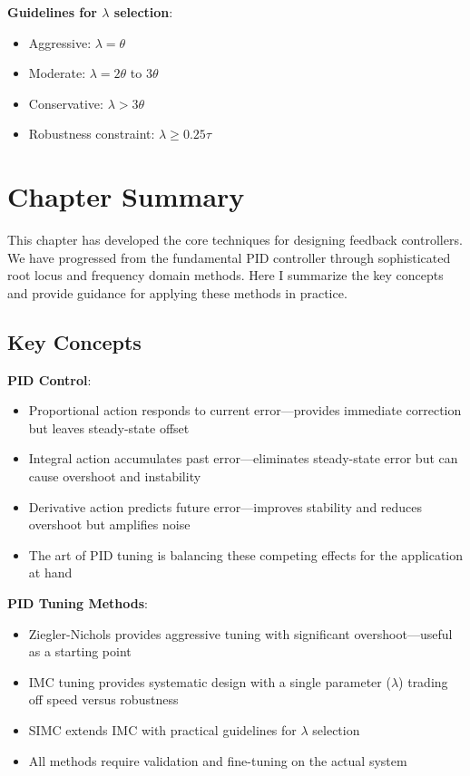 \textbf{Guidelines for $\lambda$ selection}:
\begin{itemize}
    \item Aggressive: $\lambda = \theta$
    \item Moderate: $\lambda = 2\theta$ to $3\theta$
    \item Conservative: $\lambda > 3\theta$
    \item Robustness constraint: $\lambda \geq 0.25\tau$
\end{itemize}

\section{Chapter Summary}
\label{sec:chapter_summary}

This chapter has developed the core techniques for designing feedback controllers. We have progressed from the fundamental PID controller through sophisticated root locus and frequency domain methods. Here I summarize the key concepts and provide guidance for applying these methods in practice.

\subsection{Key Concepts}

\textbf{PID Control}:
\begin{itemize}
    \item Proportional action responds to current error---provides immediate correction but leaves steady-state offset
    \item Integral action accumulates past error---eliminates steady-state error but can cause overshoot and instability
    \item Derivative action predicts future error---improves stability and reduces overshoot but amplifies noise
    \item The art of PID tuning is balancing these competing effects for the application at hand
\end{itemize}

\textbf{PID Tuning Methods}:
\begin{itemize}
    \item Ziegler-Nichols provides aggressive tuning with significant overshoot---useful as a starting point
    \item IMC tuning provides systematic design with a single parameter ($\lambda$) trading off speed versus robustness
    \item SIMC extends IMC with practical guidelines for $\lambda$ selection
    \item All methods require validation and fine-tuning on the actual system
\end{itemize}

